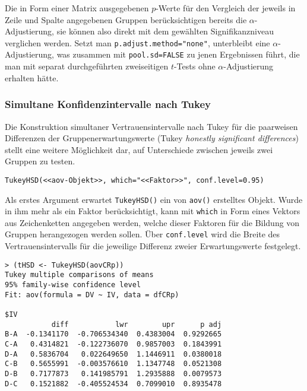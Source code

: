 Die in Form einer Matrix ausgegebenen $p$-Werte für den Vergleich der jeweils in Zeile und Spalte angegebenen Gruppen berücksichtigen bereits die $\alpha$-Adjustierung, sie können also direkt mit dem gewählten Signifikanzniveau verglichen werden. Setzt man \lstinline!p.adjust.method="none"!, unterbleibt eine $\alpha$-Adjustierung, was zusammen mit \lstinline!pool.sd=FALSE! zu jenen Ergebnissen führt, die man mit separat durchgeführten zweiseitigen $t$-Tests ohne $\alpha$-Adjustierung erhalten hätte.

\subsubsection{Simultane Konfidenzintervalle nach Tukey}
\label{sec:tukey}

Die Konstruktion simultaner Vertrauensintervalle nach Tukey für die paarweisen Differenzen der Gruppenerwartungswerte (Tukey \emph{honestly significant differences}) stellt eine weitere Möglichkeit dar, auf Unterschiede zwischen jeweils zwei Gruppen zu testen.
\begin{lstlisting}
TukeyHSD(<<aov-Objekt>>, which="<<Faktor>>", conf.level=0.95)
\end{lstlisting}

Als erstes Argument erwartet \lstinline!TukeyHSD()! ein von \lstinline!aov()! erstelltes Objekt. Wurde in ihm mehr als ein Faktor berücksichtigt, kann mit \lstinline!which! in Form eines Vektors aus Zeichenketten angegeben werden, welche dieser Faktoren für die Bildung von Gruppen herangezogen werden sollen. Über \lstinline!conf.level! wird die Breite des Vertrauensintervalls für die jeweilige Differenz zweier Erwartungswerte festgelegt.
\begin{lstlisting}
> (tHSD <- TukeyHSD(aovCRp))
Tukey multiple comparisons of means
95% family-wise confidence level
Fit: aov(formula = DV ~ IV, data = dfCRp)

$IV
           diff           lwr        upr      p adj
B-A  -0.1341170  -0.706534340  0.4383004  0.9292665
C-A   0.4314821  -0.122736070  0.9857003  0.1843991
D-A   0.5836704   0.022649650  1.1446911  0.0380018
C-B   0.5655991  -0.003576610  1.1347748  0.0521308
D-B   0.7177873   0.141985791  1.2935888  0.0079573
D-C   0.1521882  -0.405524534  0.7099010  0.8935478
\end{lstlisting}

